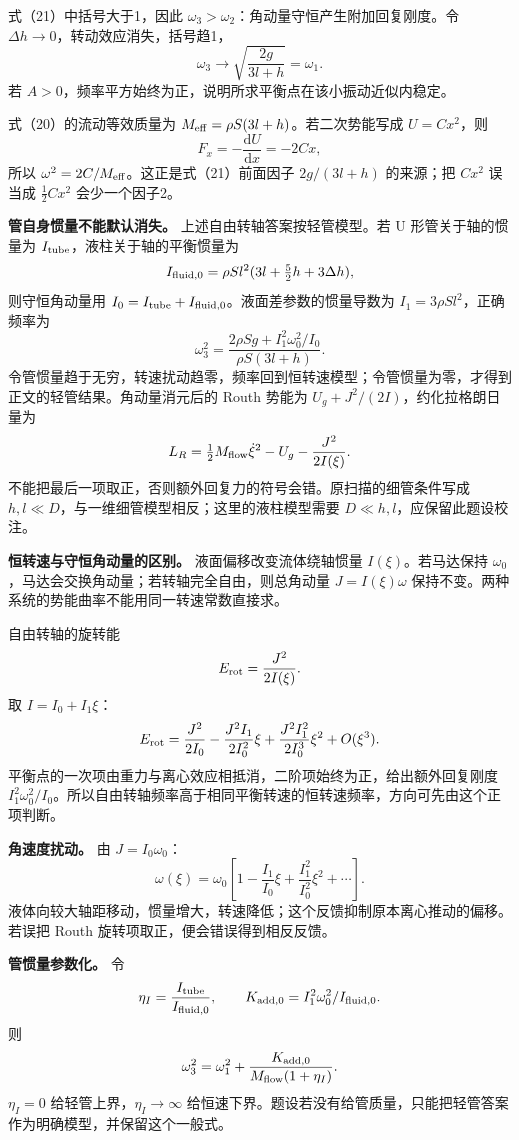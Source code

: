 \documentclass[12pt,a4paper,UTF8]{ctexart}
\begin{document}
式（21）中括号大于1，因此
\(\omega_3>\omega_2\)：角动量守恒产生附加回复刚度。令
\(\Delta h\to0\)，转动效应消失，括号趋1， \[
\omega_3\to\sqrt{\frac{2g}{3l+h}}=\omega_1.
\] 若 \(A>0\)，频率平方始终为正，说明所求平衡点在该小振动近似内稳定。

式（20）的流动等效质量为 \(M_{\rm eff}=\rho S(3l+h)\)。若二次势能写成
\(U=Cx^2\)，则 \[
F_x=-\frac{\mathrm dU}{\mathrm dx}=-2Cx,
\] 所以 \(\omega^2=2C/M_{\rm eff}\)。这正是式（21）前面因子
\(2g/(3l+h)\) 的来源；把 \(Cx^2\) 误当成 \(\frac12Cx^2\) 会少一个因子2。

\textbf{管自身惯量不能默认消失。} 上述自由转轴答案按轻管模型。若 U
形管关于轴的惯量为 \(I_{\rm tube}\)，液柱关于轴的平衡惯量为 \[
I_{\rm fluid,0}=\rho S l^2(3l+\tfrac52h+3\Delta h),
\] 则守恒角动量用
\(I_0=I_{\rm tube}+I_{\rm fluid,0}\)。液面差参数的惯量导数为
\(I_1=3\rho Sl^2\)，正确频率为 \[
\boxed{\omega_3^2=
\frac{2\rho Sg+I_1^2\omega_0^2/I_0}{\rho S(3l+h)}}.
\]
令管惯量趋于无穷，转速扰动趋零，频率回到恒转速模型；令管惯量为零，才得到正文的轻管结果。角动量消元后的
Routh 势能为 \(U_g+J^2/(2I)\)，约化拉格朗日量为 \[
L_R=\tfrac12 M_{\rm flow}\dot\xi^2-U_g-\frac{J^2}{2I(\xi)}.
\] 不能把最后一项取正，否则额外回复力的符号会错。原扫描的细管条件写成
\(h,l\ll D\)，与一维细管模型相反；这里的液柱模型需要
\(D\ll h,l\)，应保留此题设校注。

\textbf{恒转速与守恒角动量的区别。} 液面偏移改变流体绕轴惯量
\(I(\xi)\)。若马达保持
\(\omega_0\)，马达会交换角动量；若转轴完全自由，则总角动量
\(J=I(\xi)\omega\)
保持不变。两种系统的势能曲率不能用同一转速常数直接求。

自由转轴的旋转能 \[
E_{\rm rot}=\frac{J^2}{2I(\xi)}.
\] 取 \(I=I_0+I_1\xi\)： \[
E_{\rm rot}=
\frac{J^2}{2I_0}
-\frac{J^2I_1}{2I_0^2}\xi
+\frac{J^2I_1^2}{2I_0^3}\xi^2+O(\xi^3).
\]
平衡点的一次项由重力与离心效应相抵消，二阶项始终为正，给出额外回复刚度
\(I_1^2\omega_0^2/I_0\)。所以自由转轴频率高于相同平衡转速的恒转速频率，方向可先由这个正项判断。

\textbf{角速度扰动。} 由 \(J=I_0\omega_0\)： \[
\omega(\xi)=\omega_0\left[1-\frac{I_1}{I_0}\xi
+\frac{I_1^2}{I_0^2}\xi^2+\cdots\right].
\]
液体向较大轴距移动，惯量增大，转速降低；这个反馈抑制原本离心推动的偏移。若误把
Routh 旋转项取正，便会错误得到相反反馈。

\textbf{管惯量参数化。} 令 \[
\eta_I=\frac{I_{\rm tube}}{I_{\rm fluid,0}},
\qquad K_{\rm add,0}=I_1^2\omega_0^2/I_{\rm fluid,0}.
\] 则 \[
\omega_3^2=\omega_1^2+
\frac{K_{\rm add,0}}{M_{\rm flow}(1+\eta_I)}.
\] \(\eta_I=0\) 给轻管上界，\(\eta_I\to\infty\)
给恒速下界。题设若没有给管质量，只能把轻管答案作为明确模型，并保留这个一般式。
\end{document}
